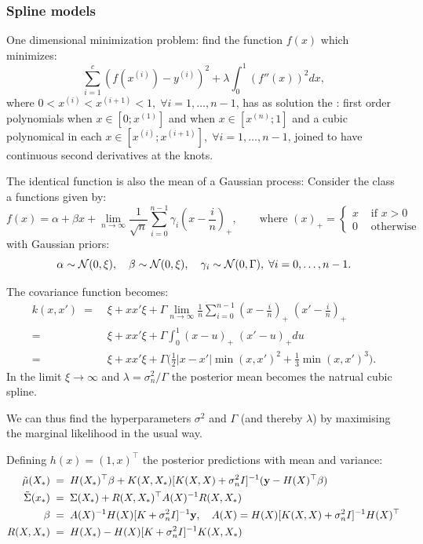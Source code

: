 \begin{frame}
\frametitle{Spline models}

One dimensional minimization problem: find the function $f(x)$ which minimizes:
\[
\sum_{i=1}^c(f(x^{(i)})-y^{(i)})^2+\lambda\int_0^1(f''(x))^2dx,
\]
where $0<x^{(i)}<x^{(i+1)}<1,\;\forall i=1,\dots, n-1$, has as solution the 
: first order polynomials when
$x\in[0;x^{(1)}]$
and when $x\in[x^{(n)};1]$ and a cubic polynomical in each
$x\in[x^{(i)};x^{(i+1)}],\;\forall i=1,\ldots,n-1$, joined to have
continuous second derivatives at the knots.

The identical function is also the mean of a Gaussian process:
Consider the class a functions given by:
\[
f(x) = \alpha + \beta x + \lim_{n\rightarrow\infty}\frac{1}{\sqrt{n}}
\sum_{i=0}^{n-1}\gamma_i(x-\frac{i}{n})_+,
\qquad\text{where\ }(x)_+=\begin{cases}x&\text{\ if\ }x>0\\ 0&\text{\ otherwise}
\end{cases}
\]
with Gaussian priors:
\[
\alpha\sim{\cal N}(0,\xi),\quad
\beta\sim{\cal N}(0,\xi),\quad
\gamma_i\sim{\cal N}(0,\Gamma),\;\forall i=0,\ldots,n-1.
\]
\end{frame}

\begin{frame}
The covariance function becomes:
\[
\begin{split}
k(x,x')\;=&\;\xi+xx'\xi +
\Gamma\lim_{n\rightarrow\infty}\frac{1}{n}\sum_{i=0}^{n-1}
(x-\frac{i}{n})_+\;(x'-\frac{i}{n})_+\\
=&\;\xi+xx'\xi + \Gamma\int_0^1(x-u)_+\;(x'-u)_+du\\
=&\;\xi+xx'\xi +
\Gamma\big(\frac{1}{2}|x-x'|\min(x,x')^2+\frac{1}{3}\min(x,x')^3\big).
\end{split}
\]
In the limit $\xi\rightarrow\infty$ and $\lambda=\sigma^2_n/\Gamma$
the posterior mean becomes the natrual cubic spline.

We can thus find the hyperparameters $\sigma^2$ and $\Gamma$ (and
thereby $\lambda$) by maximising the marginal likelihood in the usual
way.

Defining $h(x)=(1,x)^\top$ the posterior predictions with mean and variance:
\[
\begin{split}
\tilde\mu(X_*)\;&=\;H(X_*)^\top\beta+K(X,X_*)[K(X,X)+\sigma_n^2I]^{-1}({\bf y}-H(X)^\top\beta)\\
\tilde\Sigma(x_*)\;&=\;\Sigma(X_*)+R(X,X_*)^\top A(X)^{-1}R(X,X_*)\\
\beta\;&=\;A(X)^{-1}H(X)[K+\sigma_n^2I]^{-1}{\bf y},\quad
A(X) = H(X)[K(X,X)+\sigma_n^2I]^{-1}H(X)^\top\\
R(X,X_*)\;&=\;H(X_*)-H(X)[K+\sigma^2_nI]^{-1}K(X,X_*)
\end{split}
\]
\end{frame}


